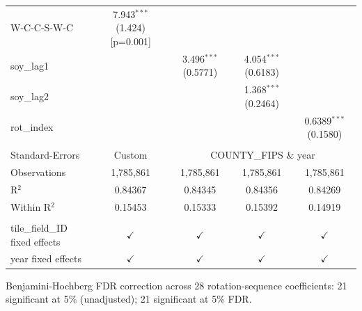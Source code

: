 \begin{table}[H]
\begin{tabular}{lcccc}
      W-C-C-S-W-C                     & 7.943$^{***}$ (1.424) [p=0.001]    &                        &                        &   \\   
      soy\_lag1                       &                          & 3.496$^{***}$ (0.5771) & 4.054$^{***}$ (0.6183) &   \\   
      soy\_lag2                       &                          &                        & 1.368$^{***}$ (0.2464) &   \\   
      rot\_index                      &                          &                        &                        & 0.6389$^{***}$ (0.1580)\\   
       \\
      Standard-Errors & Custom & \multicolumn{3}{c}{COUNTY\_FIPS \& year} \\ 
      Observations                    & 1,785,861                & 1,785,861              & 1,785,861              & 1,785,861\\  
      R$^2$                           & 0.84367                  & 0.84345                & 0.84356                & 0.84269\\  
      Within R$^2$                    & 0.15453                  & 0.15333                & 0.15392                & 0.14919\\  
       \\
      tile\_field\_ID fixed effects   & $\checkmark$             & $\checkmark$           & $\checkmark$           & $\checkmark$\\   
      year fixed effects              & $\checkmark$             & $\checkmark$           & $\checkmark$           & $\checkmark$\\   
      \bottomrule
   \end{tabular}
   
   \par \raggedright 
   Benjamini-Hochberg FDR correction across 28 rotation-sequence coefficients: 21 significant at 5\% (unadjusted); 21 significant at 5\% FDR.
\end{table}


